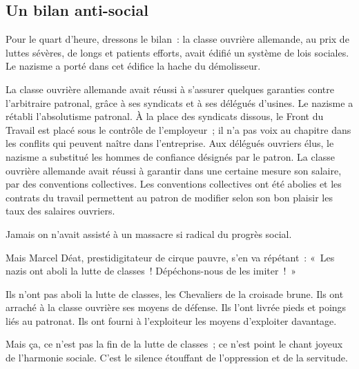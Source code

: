 \documentclass[french,twoside]{book} %
\begin{document}
\subsection[Un bilan anti-social]{Un bilan anti-social}
\noindent Pour le quart d’heure, dressons le bilan : la classe ouvrière allemande, au prix de luttes sévères, de longs et patients efforts, avait édifié un système de lois sociales. Le nazisme a porté dans cet édifice la hache du démolisseur.\par
La classe ouvrière allemande avait réussi à s’assurer quelques garanties contre l’arbitraire patronal, grâce à ses syndicats et à ses délégués d’usines. Le nazisme a rétabli l’absolutisme patronal. À la place des syndicats dissous, le Front du Travail est placé sous le contrôle de l’employeur ; il n’a pas voix au chapitre dans les conflits qui peuvent naître dans l’entreprise. Aux délégués ouvriers élus, le nazisme a substitué les hommes de confiance désignés par le patron. La classe ouvrière allemande avait réussi à garantir dans une certaine mesure son salaire, par des conventions collectives. Les conventions collectives ont été abolies et les contrats du travail permettent au patron de modifier selon son bon plaisir les taux des salaires ouvriers.\par
Jamais on n’avait assisté à un massacre si radical du progrès social.\par
Mais Marcel Déat, prestidigitateur de cirque pauvre, s’en va répétant : « Les nazis ont aboli la lutte de classes ! Dépéchons-nous de les imiter ! »\par
Ils n’ont pas aboli la lutte de classes, les Chevaliers de la croisade brune. Ils ont arraché à la classe ouvrière ses moyens de défense. Ils l’ont livrée pieds et poings liés au patronat. Ils ont fourni à l’exploiteur les moyens d’exploiter davantage.\par
Mais ça, ce n’est pas la fin de la lutte de classes ; ce n’est point le chant joyeux de l’harmonie sociale. C’est le silence étouffant de l’oppression et de la servitude.
\renewcommand{\leftmark}{7 – L’État nazi, paradis des magnats, des hobereaux, des profiteurs de guerre}
\end{document}
